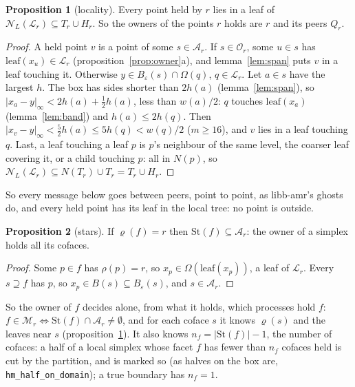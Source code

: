 \documentclass[10pt,a4paper]{article}
\theoremstyle{definition}
\newtheorem{proposition}{Proposition}
\newcommand{\fn}[1]{\texttt{#1}}
\begin{document}
\begin{proposition}[locality]
  \label{prop:local}
  Every point held by $r$ lies in a leaf of $\mathcal{N}_L(\mathcal{L}_r)
  \subseteq T_r \cup H_r$. So the owners of the points $r$ holds are $r$
  and its peers $Q_r$.
\end{proposition}
\begin{proof}
  A held point $v$ is a point of some $s \in \mathcal{A}_r$. If $s \in
  \mathcal{O}_r$, some $u \in s$ has $\mathrm{leaf}(x_u) \in \mathcal{L}_r$
  (proposition~\ref{prop:owner}a), and lemma~\ref{lem:span} puts $v$ in a
  leaf touching it. Otherwise $y \in B_\varepsilon(s) \cap \Omega(q)$, $q
  \in \mathcal{L}_r$. Let $a \in s$ have the largest $h$. The box has
  sides shorter than $2h(a)$ (lemma~\ref{lem:span}), so $|x_a -
  y|_\infty < 2h(a) + \tfrac12 h(a)$, less than $w(a)/2$: $q$ touches
  $\mathrm{leaf}(x_a)$ (lemma~\ref{lem:band}) and $h(a) \le 2 h(q)$. Then
  $|x_v - y|_\infty < \tfrac52 h(a) \le 5 h(q) < w(q)/2$ ($m \ge 16$), and
  $v$ lies in a leaf touching $q$. Last, a leaf touching a leaf $p$ is
  $p$'s neighbour of the same level, the coarser leaf covering it, or a
  child touching $p$: all in $N(p)$, so $\mathcal{N}_L(\mathcal{L}_r)
  \subseteq N(T_r) \cup T_r = T_r \cup H_r$.
\end{proof}

So every message below goes between peers, point to point, as libb-amr's
ghosts do, and every held point has its leaf in the local tree: no point
is outside.

\begin{proposition}[stars]
  \label{prop:star}
  If $\varrho(f) = r$ then $\mathrm{St}(f) \subseteq \mathcal{A}_r$: the
  owner of a simplex holds all its cofaces.
\end{proposition}
\begin{proof}
  Some $p \in f$ has $\rho(p) = r$, so $x_p \in \Omega(\mathrm{leaf}(x_p))$,
  a leaf of $\mathcal{L}_r$. Every $s \supseteq f$ has $p$, so $x_p \in
  B(s) \subseteq B_\varepsilon(s)$, and $s \in \mathcal{A}_r$.
\end{proof}

So the owner of $f$ decides alone, from what it holds, which processes hold
$f$: $f \in \mathcal{M}_r \iff \mathrm{St}(f) \cap \mathcal{A}_r \ne
\emptyset$, and for each coface $s$ it knows $\varrho(s)$ and the leaves
near $s$ (proposition~\ref{prop:local}). It also knows $n_f =
|\mathrm{St}(f)| - 1$, the number of cofaces: a half of a local simplex
whose facet $f$ has fewer than $n_f$ cofaces held is cut by the partition,
and is marked so (as halves on the box are, \fn{hm\_half\_on\_domain}); a
true boundary has $n_f = 1$.
\end{document}

